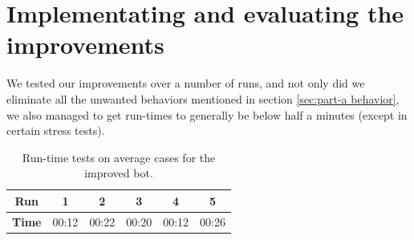 \documentclass[a4paper,10pt]{article}
\begin{document}
\section{Implementating and evaluating the improvements}

We tested our improvements over a number of runs, and not only did we eliminate
all the unwanted behaviors  mentioned in section \ref{sec:part-a behavior}, we also managed 
to get run-times to generally be below half a minutes (except in certain stress tests).

\begin{table}
    \centering
    \begin{tabular}{c|c|c|c|c|c}
        \textbf{Run}    & \textbf{1} & \textbf{2} & \textbf{3} &
        \textbf{4}      & \textbf{5}     \\ \hline
        \textbf{Time}   & 00:12 & 00:22 & 00:20 & 00:12 & 00:26 \\
    \end{tabular}
    \caption{Run-time tests on average cases for the improved bot.}
\end{table}
\end{document}
